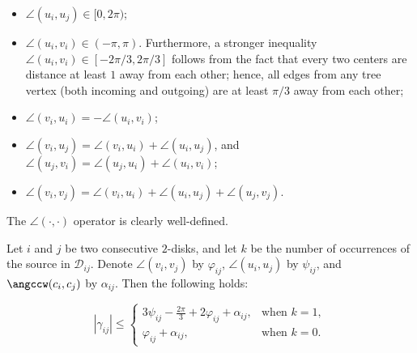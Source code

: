 \begin{itemize}
\item $\angle(u_i, u_j)\in[0, 2\pi)$;
\item $\angle(u_i, v_i)\in(-\pi, \pi)$. Furthermore, a stronger inequality $\angle(u_i, v_i)\in[-2\pi/3, 2\pi/3]$ follows from the fact that every two centers are distance at least $1$ away from each other; hence, all edges from any tree vertex (both incoming and outgoing) are at least $\pi/3$ away from each other;
\item $\angle(v_i, u_i) = -\angle(u_i, v_i)$;
\item $\angle(v_i, u_j) = \angle(v_i, u_i) + \angle(u_i, u_j)$, and $\angle(u_j, v_i) = \angle(u_j, u_i) + \angle(u_i, v_i)$;
\item $\angle(v_i, v_j) = \angle(v_i, u_i) + \angle(u_i, u_j) + \angle(u_j, v_j)$.
\end{itemize}

The $\angle(\cdot, \cdot)$ operator is clearly well-defined.



\begin{claim}
\label{lemma:can-construct}

Let $i$ and $j$ be two consecutive $2$-disks, and let $k$ be the number of occurrences of the source in $\mathcal{D}_{ij}$. Denote $\angle(v_i, v_j)$ by $\varphi_{ij}$, $\angle(u_i, u_j)$ by $\psi_{ij}$, and $\angccw(c_i, c_j)$ by $\alpha_{ij}$. Then the following holds:

\begin{equation}
\label{eq:curve_bound}
|\gamma_{ij}|\leq\begin{cases}
\displaystyle
3\psi_{ij} - \frac{2\pi}{3} + 2\varphi_{ij} + \alpha_{ij}, & \text{when }k = 1, \\
\varphi_{ij} + \alpha_{ij}, & \text{when }k = 0.
\end{cases}%
\end{equation}
\end{claim}

